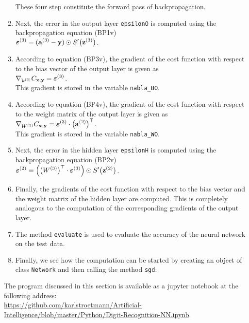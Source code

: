 \begin{enumerate}
      These four step constitute the forward pass of backpropagation.
\item Next, the error in the output layer \texttt{epsilonO} is computed using the backpropagation equation
      (BP1v)
      \\[0.2cm]
      \hspace*{1.3cm}
      $\displaystyle \boldsymbol{\varepsilon}^{(3)} = (\mathbf{a}^{(3)} - \mathbf{y}) \odot S'\bigl(\mathbf{z}^{(3)}\bigr)$.
\item According to  equation (BP3v), the gradient of the cost function with respect to the bias vector of the
      output layer is given as
      \\[0.2cm]
      \hspace*{1.3cm}
      $\displaystyle \nabla_{\mathbf{b}^{(3)}} C_{\mathbf{x}, \mathbf{y}} = \boldsymbol{\varepsilon}^{(3)}$.
      \\[0.2cm]
      This gradient is stored in the variable \texttt{nabla\_BO}.
\item According to equation (BP4v), the gradient  of the cost function with respect to the weight matrix of the
      output layer is given as
      \\[0.2cm]
      \hspace*{1.3cm}
      $\displaystyle \nabla_{W^{(3)}} C_{\mathbf{x}, \mathbf{y}} = \boldsymbol{\varepsilon}^{(3)} \cdot \bigl(\mathbf{a}^{(2)}\bigr)^\top$.
      \\[0.2cm]
      This gradient is stored in the variable \texttt{nabla\_WO}.
\item Next, the error in the hidden layer \texttt{epsilonH} is computed using the backpropagation equation
      (BP2v)
      \\[0.2cm]
      \hspace*{1.3cm}
      $\displaystyle \boldsymbol{\varepsilon}^{(2)} = \Bigl(\bigl(W^{(3)}\bigr)^\top \cdot \boldsymbol{\varepsilon}^{(3)}\Bigr) \odot
           S'\bigl(\mathbf{z}^{(2)}\bigr)
      $.
\item Finally, the gradients of the cost function with respect to the bias
      vector and the weight matrix of the hidden layer are computed.  This is completely analogous to the computation of
      the corresponding gradients of the output layer.
\item The method \texttt{evaluate} is used to evaluate the accuracy of the neural network on the test data.
\item Finally, we see how the computation can be started by creating an object of class \texttt{Network} and
      then calling the method \texttt{sgd}.
\end{enumerate}
The program discussed in this section is available as a jupyter notebook at the following address:
\\[0.2cm]
\href{https://github.com/karlstroetmann/Artificial-Intelligence/blob/master/Python/Digit-Recognition.ipynb}{https://github.com/karlstroetmann/Artificial-Intelligence/blob/master/Python/Digit-Recognition-NN.ipynb}.





